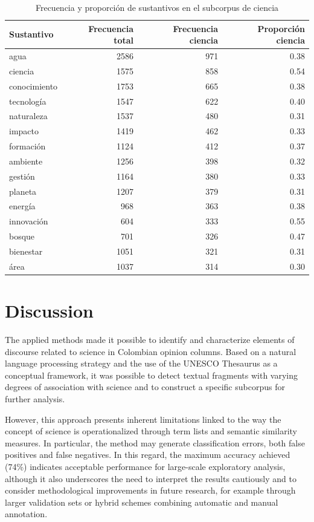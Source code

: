 \documentclass[11pt,a4paper]{article}
\begin{document}
\begin{table}[H]
	\centering
	\begin{tabular}{lrrr}
		\toprule
		\textbf{Sustantivo} & \textbf{Frecuencia total} & \textbf{Frecuencia ciencia} & \textbf{Proporción ciencia} \\
		\midrule
		agua          & 2586 & 971 & 0.38 \\
		ciencia       & 1575 & 858 & 0.54 \\
		conocimiento  & 1753 & 665 & 0.38 \\
		tecnología    & 1547 & 622 & 0.40 \\
		naturaleza    & 1537 & 480 & 0.31 \\
		impacto       & 1419 & 462 & 0.33 \\
		formación     & 1124 & 412 & 0.37 \\
		ambiente      & 1256 & 398 & 0.32 \\
		gestión       & 1164 & 380 & 0.33 \\
		planeta       & 1207 & 379 & 0.31 \\
		energía       & 968  & 363 & 0.38 \\
		innovación    & 604  & 333 & 0.55 \\
		bosque        & 701  & 326 & 0.47 \\
		bienestar     & 1051 & 321 & 0.31 \\
		área          & 1037 & 314 & 0.30 \\
		\bottomrule
	\end{tabular}
	\caption{Frecuencia y proporción de sustantivos en el subcorpus de ciencia}
	\label{tab:sustantivos_ciencia}
\end{table}

	
\section{Discussion}
	
The applied methods made it possible to identify and characterize elements of discourse related to science in Colombian opinion columns. Based on a natural language processing strategy and the use of the UNESCO Thesaurus as a conceptual framework, it was possible to detect textual fragments with varying degrees of association with science and to construct a specific subcorpus for further analysis.


However, this approach presents inherent limitations linked to the way the concept of science is operationalized through term lists and semantic similarity measures. In particular, the method may generate classification errors, both false positives and false negatives. In this regard, the maximum accuracy achieved (74\%) indicates acceptable performance for large-scale exploratory analysis, although it also underscores the need to interpret the results cautiously and to consider methodological improvements in future research, for example through larger validation sets or hybrid schemes combining automatic and manual annotation.
\end{document}
